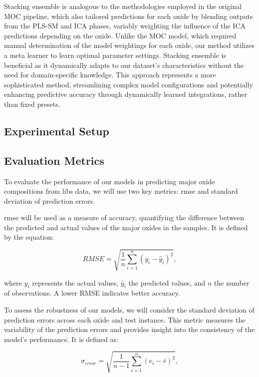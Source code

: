 Stacking ensemble is analogous to the methodologies employed in the original MOC pipeline, which also tailored predictions for each oxide by blending outputs from the PLS-SM and ICA phases, variably weighting the influence of the ICA predictions depending on the oxide.
Unlike the MOC model, which required manual determination of the model weightings for each oxide, our method utilizes a meta learner to learn optimal parameter settings. 
Stacking ensemble is beneficial as it dynamically adapts to our dataset's characteristics without the need for domain-specific knowledge.
This approach represents a more sophisticated method, streamlining complex model configurations and potentially enhancing predictive accuracy through dynamically learned integrations, rather than fixed presets.

\subsection{Experimental Setup}

\subsection{Evaluation Metrics}
To evaluate the performance of our models in predicting major oxide compositions from \gls{libs} data, we will use two key metrics: \gls{rmse} and standard deviation of prediction errors.

\gls{rmse} will be used as a measure of accuracy, quantifying the difference between the predicted and actual values of the major oxides in the samples. It is defined by the equation:

\begin{equation}
    RMSE = \sqrt{\frac{1}{n} \sum_{i=1}^{n} (y_i - \hat{y}_i)^2},
\end{equation}

where $y_i$ represents the actual values, $\hat{y}_i$ the predicted values, and $n$ the number of observations. A lower RMSE indicates better accuracy.

To assess the robustness of our models, we will consider the standard deviation of prediction errors across each oxide and test instance. This metric measures the variability of the prediction errors and provides insight into the consistency of the model's performance. It is defined as:

\begin{equation}
    \sigma_{error} = \sqrt{\frac{1}{n-1} \sum_{i=1}^{n} (e_i - \bar{e})^2},
\end{equation}

